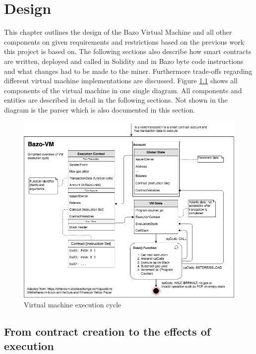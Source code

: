 \chapter{Design}
\thispagestyle{main} %
This chapter outlines the design of the Bazo Virtual Machine and all other components on given requirements and restrictions based on the previous work this project is based on. The following sections also describe how smart contracts are written, deployed and called in Solidity and in Bazo byte code instructions and what changes had to be made to the miner. Furthermore trade-offs regarding different virtual machine implementations are discussed. Figure \ref{vmexecutioncycle} shows all components of the virtual machine in one single diagram. All components and entities are described in detail in the following sections. Not shown in the diagram is the parser which is also documented in this section.

\begin{figure}[H]
	\begin{center}
	\includegraphics[width=\textwidth]{./images/execution-cycle}
	\caption{Virtual machine execution cycle}
	\label{vmexecutioncycle}
	\end{center}
\end{figure}

\section{From contract creation to the effects of execution}
